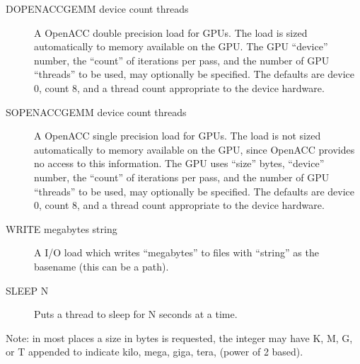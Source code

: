 \begin{description}
        \item[DOPENACCGEMM device count threads] A OpenACC double precision load for GPUs. The load is sized automatically to memory available on the GPU. The GPU ``device'' number, the ``count''
        of iterations per pass, and the number of GPU ``threads'' to be used, may optionally be specified.  The defaults are device 0, count 8, and a thread count appropriate to the device hardware.
        \item[SOPENACCGEMM device count threads] A OpenACC single precision load for GPUs. The load is not sized automatically to memory available on the GPU, since OpenACC provides no access to this information. The GPU uses ``size'' bytes, ``device'' number, the ``count''
        of iterations per pass, and the number of GPU ``threads'' to be used, may optionally be specified.  The defaults are device 0, count 8, and a thread count appropriate to the device hardware.
	\item[WRITE megabytes string] A I/O load which writes ``megabytes'' to files with ``string'' as the basename (this can be a path).
	\item[SLEEP N] Puts a thread to sleep for N seconds at a time. 
\end{description}

Note: in most places a size in bytes is requested, the integer may have K, M, G, or T appended to indicate kilo, mega, giga, tera, (power of 2 based).
